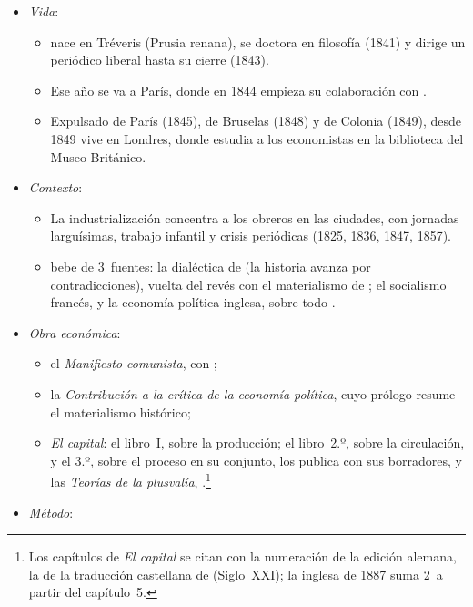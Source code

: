 \documentclass[11pt]{article}
\begin{document}
\begin{itemize}
\item \emph{Vida}:
  \begin{itemize}
  \item {} nace en Tréveris (Prusia renana), se doctora en filosofía (1841) y dirige un periódico liberal hasta su cierre (1843).
  \item Ese año se va a París, donde en 1844 empieza su colaboración con .
  \item Expulsado de París (1845), de Bruselas (1848) y de Colonia (1849), desde 1849 vive en Londres, donde estudia a los economistas en la biblioteca del Museo Británico.
  \end{itemize}
\item \emph{Contexto}:
  \begin{itemize}
  \item La industrialización concentra a los obreros en las ciudades, con jornadas larguísimas, trabajo infantil y crisis periódicas (1825, 1836, 1847, 1857).
  \item {} bebe de 3~fuentes: la dialéctica de  (la historia avanza por contradicciones), vuelta del revés con el materialismo de ; el socialismo francés, y la economía política inglesa, sobre todo .
  \end{itemize}
\item \emph{Obra económica}:
  \begin{itemize}
  \item el \emph{Manifiesto comunista}, con \nocite{MarxEngels1848Manifest};
  \item la \emph{Contribución a la crítica de la economía política}\nocite{Marx1859Kritik}, cuyo prólogo resume el materialismo histórico;
  \item \emph{El capital}: el libro~I, sobre la producción\nocite{Marx1867Kapital}; el libro~2.º, sobre la circulación\nocite{Marx1885Kapital}, y el 3.º, sobre el proceso en su conjunto\nocite{Marx1894Kapital}, los publica  con sus borradores, y las \emph{Teorías de la plusvalía}, \nocite{Marx1905Theorien}.\footnote{Los capítulos de \emph{El capital} se citan con la numeración de la edición alemana, la de la traducción castellana de  (Siglo~XXI); la inglesa de 1887 suma 2~a partir del capítulo~5.}
  \end{itemize}
\item \emph{Método}:

\end{itemize}
\end{document}
